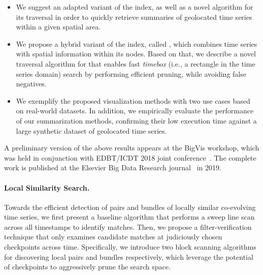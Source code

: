 \begin{itemize}
 \item We suggest an adapted variant of the \btsr index, as well as a novel algorithm for its traversal in order to quickly retrieve summaries of geolocated time series within a given spatial area.
 \item We propose a hybrid variant of the \isax index, called \hisax, which combines time series with spatial information within its nodes. Based on that, we describe a novel traversal algorithm for \hisax that enables fast \textit{timebox} (i.e., a rectangle in the time series domain) search by performing efficient pruning, while avoiding false negatives.
 \item We exemplify the proposed visualization methods with two use cases based on real-world datasets. In addition, we empirically evaluate the performance of our summarization methods, confirming their low execution time against a large synthetic dataset of geolocated time series.
\end{itemize}

A preliminary version of the above results appears at the BigVis workshop, which was held in conjunction with EDBT/ICDT 2018 joint conference~\cite{chatzigeorgakidis2018map}. The complete work is published at the Elsevier Big Data Research journal~\cite{chatzigeorgakidis2019visual} in 2019.

\paragraph{Local Similarity Search.} Towards the efficient detection of pairs and bundles of locally similar co-evolving time series, we first present a baseline algorithm that performs a sweep line scan across all timestamps to identify matches. Then, we propose a filter-verification technique that only examines candidate matches at judiciously chosen checkpoints across time. Specifically, we introduce two block scanning algorithms for discovering local pairs and bundles respectively, which leverage the potential of checkpoints to aggressively prune the search space.

